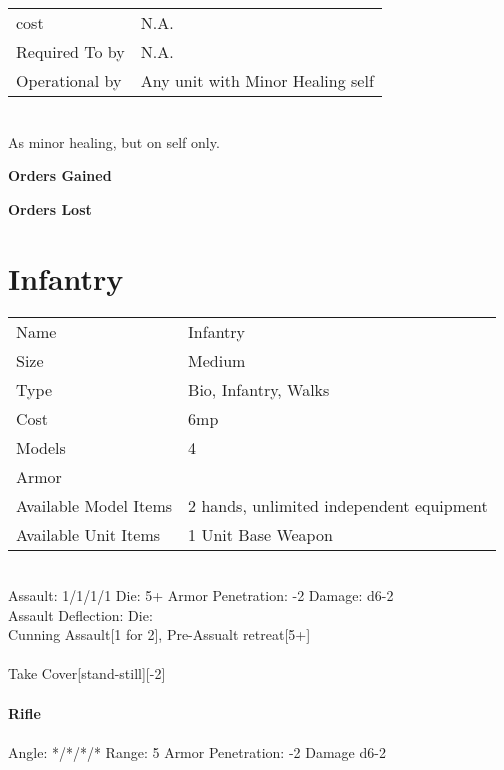\begin{tabular}{ll}
  cost & N.A.\\
  Required To by & N.A.\\
  Operational by & Any unit with Minor Healing self\\

\end{tabular}
\ \\
As minor healing, but on self only.

{\bf Orders Gained    }

\noindent 

{\bf Orders Lost }

\noindent 
\pagebreak

\section{ Infantry }

\begin{tabular}{ll}
  Name & Infantry \\
  Size & Medium\\
  Type & Bio, Infantry, Walks\\
  Cost & 6mp\\
  Models & 4\\
  Armor & \\
  Available Model Items & 2 hands, unlimited independent equipment \\
  Available Unit Items & 1 Unit Base Weapon \\
\end{tabular}

\ \\
Assault: 1/1/1/1 Die: 5+ Armor Penetration: -2 Damage: d6-2 \\
Assault Deflection:  Die: \\
\indent Cunning Assault[1 for 2], Pre-Assualt retreat[5+] \\
\ \\
Take Cover[stand-still][-2]
\ \\
\ \\
{\bf Rifle } \\
\ \\
Angle: */*/*/* Range: 5 Armor Penetration: -2 Damage d6-2 \\
\indent  \\





